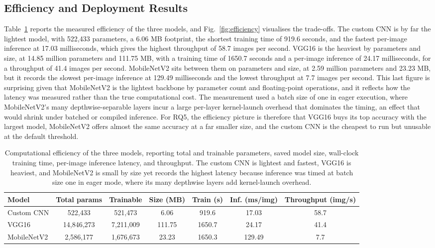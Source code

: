 \documentclass[preprint,12pt]{elsarticle}
\begin{document}
\subsection{Efficiency and Deployment Results}
Table~\ref{tab:efficiency} reports the measured efficiency of the three models, and Fig.~\ref{fig:efficiency} visualises the trade-offs.
The custom CNN is by far the lightest model, with 522{,}433 parameters, a 6.06 MB footprint, the shortest training time of 919.6 seconds, and the fastest per-image inference at 17.03 milliseconds, which gives the highest throughput of 58.7 images per second.
VGG16 is the heaviest by parameters and size, at 14.85 million parameters and 111.75 MB, with a training time of 1650.7 seconds and a per-image inference of 24.17 milliseconds, for a throughput of 41.4 images per second.
MobileNetV2 sits between them on parameters and size, at 2.59 million parameters and 23.23 MB, but it records the slowest per-image inference at 129.49 milliseconds and the lowest throughput at 7.7 images per second.
This last figure is surprising given that MobileNetV2 is the lightest backbone by parameter count and floating-point operations, and it reflects how the latency was measured rather than the true computational cost.
The measurement used a batch size of one in eager execution, where MobileNetV2's many depthwise-separable layers incur a large per-layer kernel-launch overhead that dominates the timing, an effect that would shrink under batched or compiled inference.
For RQ5, the efficiency picture is therefore that VGG16 buys its top accuracy with the largest model, MobileNetV2 offers almost the same accuracy at a far smaller size, and the custom CNN is the cheapest to run but unusable at the default threshold.

\begin{table}[!ht]
\centering
\caption{Computational efficiency of the three models, reporting total and trainable parameters, saved model size, wall-clock training time, per-image inference latency, and throughput. The custom CNN is lightest and fastest, VGG16 is heaviest, and MobileNetV2 is small by size yet records the highest latency because inference was timed at batch size one in eager mode, where its many depthwise layers add kernel-launch overhead.}
\label{tab:efficiency}
\begin{adjustbox}{max width=\textwidth}
\begin{tabular}{l c c c c c c}
\toprule
\textbf{Model} & \textbf{Total params} & \textbf{Trainable} & \textbf{Size (MB)} & \textbf{Train (s)} & \textbf{Inf. (ms/img)} & \textbf{Throughput (img/s)} \\
\midrule
Custom CNN & 522{,}433 & 521{,}473 & 6.06 & 919.6 & 17.03 & 58.7 \\
VGG16 & 14{,}846{,}273 & 7{,}211{,}009 & 111.75 & 1650.7 & 24.17 & 41.4 \\
MobileNetV2 & 2{,}586{,}177 & 1{,}676{,}673 & 23.23 & 1650.3 & 129.49 & 7.7 \\
\bottomrule
\end{tabular}
\end{adjustbox}
\end{table}
\end{document}
